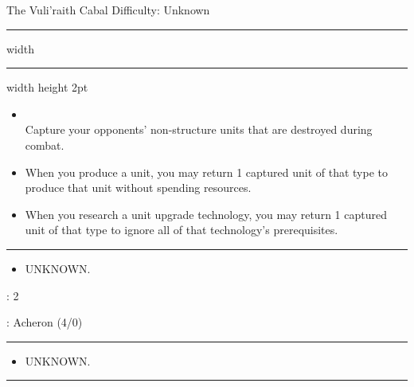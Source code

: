 {\handel\Huge The Vuli'raith Cabal} \hfill {\Large Difficulty: Unknown} \vspace{-4pt}\\
\hrule width \hsize \kern 1mm \hrule width \hsize height 2pt


\begin{multicols}{2}


\begin{itemize}
\item {}\\
Capture your opponents' non-structure units that are destroyed during combat.
\item {} When you produce a unit, you may return 1 captured unit of that type to produce that unit without spending resources.
\item {} When you research a unit upgrade technology, you may return 1 captured unit of that type to ignore all of that technology's prerequisites.
\end{itemize}


\vspace{-10pt}\rule{\hsize}{0.4pt}\vspace{5pt}


\vspace{-5pt}
\begin{multicols}{2}
\begin{itemize}
\item UNKNOWN.
\end{itemize}
\end{multicols}

\vspace{-5pt}
: 2

\vspace{2pt}
: Acheron (4/0)

\rule{\hsize}{0.4pt}\vspace{5pt}


\begin{itemize}
\item UNKNOWN. %
\end{itemize}

\vspace{-10pt}\rule{\hsize}{0.4pt}\vspace{5pt}



\end{multicols}
